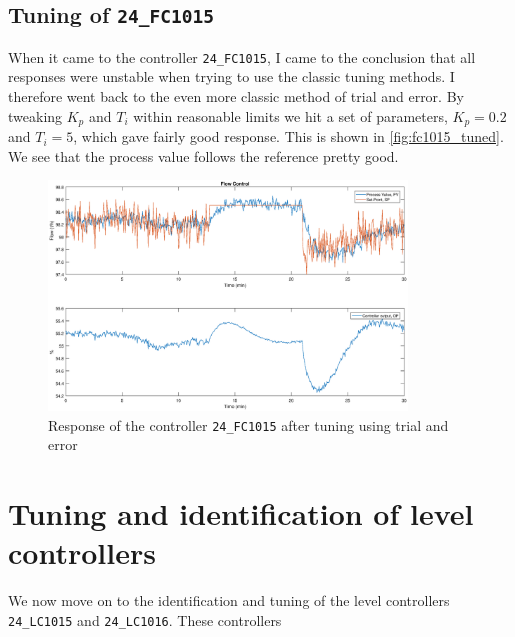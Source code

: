 \subsection{Tuning of \texttt{24\_FC1015}}
When it came to the controller \texttt{24\_FC1015}, I came to the conclusion that all responses were unstable when trying to use the classic tuning methods. I therefore went back to the even more classic method of trial and error. By tweaking $K_p$ and $T_i$ within reasonable limits we hit a set of parameters, $K_p = 0.2$ and $T_i = 5$, which gave fairly good response. This is shown in \autoref{fig:fc1015_tuned}. We see that the process value follows the reference pretty good.

\begin{figure}[ht!]
	\centering
	\includegraphics[width=0.85\textwidth]{fig/tuning/FC1015_tuned.eps}
	\caption{Response of the controller \texttt{24\_FC1015} after tuning using trial and error}
	\label{fig:fc1015_tuned}
\end{figure}

\section{Tuning and identification of level controllers}
We now move on to the identification and tuning of the level controllers \texttt{24\_LC1015} and \texttt{24\_LC1016}. These controllers